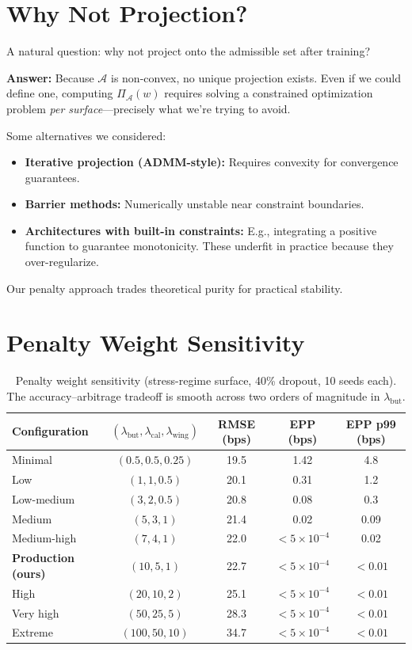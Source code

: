 \documentclass[11pt,a4paper]{article}
\begin{document}
\section{Why Not Projection?}
\label{app:projection}

A natural question: why not project onto the admissible set after training?

\textbf{Answer:} Because $\mathcal{A}$ is non-convex, no unique projection exists. Even if we could define one, computing $\Pi_{\mathcal{A}}(w)$ requires solving a constrained optimization problem \textit{per surface}---precisely what we're trying to avoid.

Some alternatives we considered:
\begin{itemize}
    \item \textbf{Iterative projection (ADMM-style):} Requires convexity for convergence guarantees.
    \item \textbf{Barrier methods:} Numerically unstable near constraint boundaries.
    \item \textbf{Architectures with built-in constraints:} E.g., integrating a positive function to guarantee monotonicity. These underfit in practice because they over-regularize.
\end{itemize}

Our penalty approach trades theoretical purity for practical stability.

\section{Penalty Weight Sensitivity}
\label{app:penalty_sweep}

\begin{table}[h]
\centering
\caption{Penalty weight sensitivity (stress-regime surface, 40\% dropout, 10 seeds each). The accuracy--arbitrage tradeoff is smooth across two orders of magnitude in $\lambda_{\text{but}}$.}
\label{tab:lambda_sensitivity}
\begin{tabular}{lcccc}
\toprule
\textbf{Configuration} & $(\lambda_{\text{but}}, \lambda_{\text{cal}}, \lambda_{\text{wing}})$ & \textbf{RMSE (bps)} & \textbf{EPP (bps)} & \textbf{EPP p99 (bps)} \\
\midrule
Minimal & $(0.5, 0.5, 0.25)$ & 19.5 & 1.42 & 4.8 \\
Low & $(1, 1, 0.5)$ & 20.1 & 0.31 & 1.2 \\
Low-medium & $(3, 2, 0.5)$ & 20.8 & 0.08 & 0.3 \\
Medium & $(5, 3, 1)$ & 21.4 & 0.02 & 0.09 \\
Medium-high & $(7, 4, 1)$ & 22.0 & $< 5 \times 10^{-4}$ & 0.02 \\
\textbf{Production (ours)} & $(10, 5, 1)$ & 22.7 & $< 5 \times 10^{-4}$ & $< 0.01$ \\
High & $(20, 10, 2)$ & 25.1 & $< 5 \times 10^{-4}$ & $< 0.01$ \\
Very high & $(50, 25, 5)$ & 28.3 & $< 5 \times 10^{-4}$ & $< 0.01$ \\
Extreme & $(100, 50, 10)$ & 34.7 & $< 5 \times 10^{-4}$ & $< 0.01$ \\
\bottomrule
\end{tabular}
\end{table}
\end{document}

